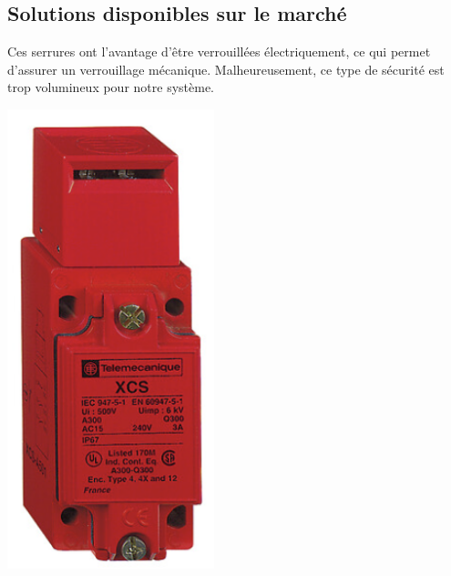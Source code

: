 \subsection{Solutions disponibles sur le marché}
\begin{minipage}[c]{0.6\textwidth}

    Ces serrures ont l'avantage d'être verrouillées électriquement, ce qui permet d'assurer un verrouillage mécanique. Malheureusement, ce type de sécurité est trop volumineux pour notre système.
\end{minipage}\hfill
\begin{minipage}[c]{0.35\textwidth}
    \begin{center}
        \includegraphics[width=0.45\textwidth]{assets/figures/Protections_laser/Securite_electrique/serrure_telemecanique.png}
    \end{center}
    \label{interrupteur_telemecanique}
\end{minipage}

